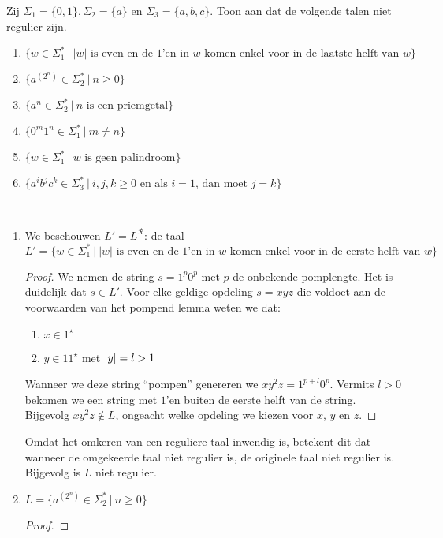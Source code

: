 \documentclass[a4paper]{article}
\newcommand{\R}{\mathcal{R}}
\begin{document}
\begin{question}
Zij $\Sigma_1 = \{0,1\}, \Sigma_2 = \{a\}$ en $\Sigma_3 = \{a,b,c\}$. Toon aan dat de volgende talen niet regulier zijn.
\begin{enumerate}
  \item $\{ w \in \Sigma_1^*\ |\ \mbox{$\left|w\right|$ is even en de $1$'en in $w$ komen enkel voor in de laatste helft van $w$}\}$
  \item $\{ a^{\left( 2^n \right) } \in \Sigma_2^* \ | \ n \geq 0 \}$
  \item $\{ a^n \in \Sigma_2^*\ | \ \mbox{$n$ is een priemgetal} \}$
  \item $\{ 0^m1^n \in \Sigma_1^* \ | \ m \neq n \}$
  \item $\{ w \in \Sigma_1^* \ | \ \mbox{$w$ is geen palindroom} \}$
  \item $\{ a^ib^jc^k \in \Sigma_3^* \ | \ \mbox{$i,j,k \geq 0$ en als $i = 1$, dan moet $j=k$} \}$
\end{enumerate}
\begin{answer}~~
\begin{enumerate}
 \item We beschouwen $L'=L^{\R}$: de taal
 \begin{equation}
 L'=\{ w \in \Sigma_1^*\ |\ \mbox{$\left|w\right|$ is even en de $1$'en in $w$ komen enkel voor in de eerste helft van $w$}\}
 \end{equation}
 \begin{proof}
  We nemen de string $s=1^p0^p$ met $p$ de onbekende pomplengte. Het is duidelijk dat $s\in L'$. Voor elke geldige opdeling $s=xyz$ die voldoet aan de voorwaarden van het pompend lemma weten we dat:
  \begin{enumerate}
   \item $x\in 1^{\star}$
   \item $y\in 11^{\star}$ met $\left|y\right|=l>1$
  \end{enumerate}
  Wanneer we deze string ``pompen'' genereren we $xy^2z=1^{p+l}0^p$. Vermits $l>0$ bekomen we een string met $1$'en buiten de eerste helft van de string. Bijgevolg $xy^2z\notin L$, ongeacht welke opdeling
  we kiezen voor $x$, $y$ en $z$.
 \end{proof}
 Omdat het omkeren van een reguliere taal inwendig is, betekent dit dat wanneer de omgekeerde taal niet regulier is, de originele taal niet regulier is. Bijgevolg is $L$ niet regulier.
 \item $L=\{ a^{\left( 2^n \right) } \in \Sigma_2^* \ | \ n \geq 0 \}$
 \begin{proof}

\end{proof}
\end{enumerate}
\end{answer}
\end{question}
\end{document}
